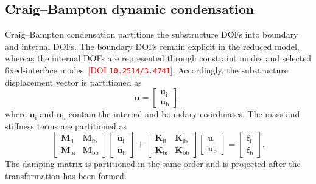 \documentclass[11pt,a4paper]{article}
\numberwithin{equation}{section}
\newcommand{\rev}[1]{\textcolor{red}{#1}}
\begin{document}
\subsection{Craig--Bampton dynamic condensation}
\label{sec:cb-condensation}

Craig--Bampton condensation partitions the substructure DOFs into boundary and internal DOFs. The boundary DOFs remain explicit in the reduced model, whereas the internal DOFs are represented through constraint modes and selected fixed-interface modes \cite{CraigBampton1968}\,\rev{[DOI \nolinkurl{10.2514/3.4741}]}. Accordingly, the substructure displacement vector is partitioned as
\begin{equation}
	\bm{u}=
	\begin{bmatrix}
		\bm{u}_{\mathrm{i}}\\
		\bm{u}_{\mathrm{b}}
	\end{bmatrix},
	\label{eq:cb-coordinate-order}
\end{equation}
where \(\bm{u}_{\mathrm{i}}\) and \(\bm{u}_{\mathrm{b}}\) contain the internal and boundary coordinates. The mass and stiffness terms are partitioned as
\begin{equation}
	\begin{bmatrix}
		\mathbf{M}_{\mathrm{ii}} & \mathbf{M}_{\mathrm{ib}}\\
		\mathbf{M}_{\mathrm{bi}} & \mathbf{M}_{\mathrm{bb}}
	\end{bmatrix}
	\begin{bmatrix}
		\ddot{\bm{u}}_{\mathrm{i}}\\
		\ddot{\bm{u}}_{\mathrm{b}}
	\end{bmatrix}
	+
	\begin{bmatrix}
		\mathbf{K}_{\mathrm{ii}} & \mathbf{K}_{\mathrm{ib}}\\
		\mathbf{K}_{\mathrm{bi}} & \mathbf{K}_{\mathrm{bb}}
	\end{bmatrix}
	\begin{bmatrix}
		\bm{u}_{\mathrm{i}}\\
		\bm{u}_{\mathrm{b}}
	\end{bmatrix}
	=
	\begin{bmatrix}
		\bm{f}_{\mathrm{i}}\\
		\bm{f}_{\mathrm{b}}
	\end{bmatrix}.
	\label{eq:cb-partitioned-eom}
\end{equation}
The damping matrix is partitioned in the same order and is projected after the transformation has been formed.
\end{document}
